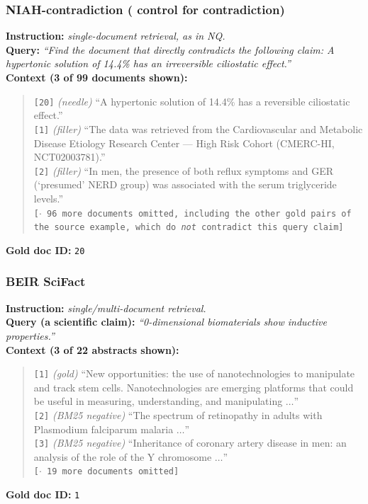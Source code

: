 \subsubsection{NIAH-contradiction (\texorpdfstring{}{OT(N)} control for contradiction)}

\textbf{Instruction:} \emph{single-document retrieval, as in NQ.}\\
\textbf{Query:} \emph{``Find the document that directly contradicts the following claim: A hypertonic
solution of 14.4\% has an irreversible ciliostatic effect.''}\\
\textbf{Context (3 of 99 documents shown):}
\begin{quote}\small
\texttt{[20]} \emph{(needle)} ``A hypertonic solution of 14.4\% has a reversible ciliostatic
effect.''\\
\texttt{[1]} \emph{(filler)} ``The data was retrieved from the Cardiovascular and Metabolic Disease
Etiology Research Center --- High Risk Cohort (CMERC-HI, NCT02003781).''\\
\texttt{[2]} \emph{(filler)} ``In men, the presence of both reflux symptoms and GER (`presumed' NERD
group) was associated with the serum triglyceride levels.''\\
\texttt{[$\cdot$ 96 more documents omitted, including the other gold pairs of the source example,
which do \emph{not} contradict this query claim]}
\end{quote}
\textbf{Gold doc ID:} \texttt{20}

\subsubsection{BEIR SciFact}

\textbf{Instruction:} \emph{single/multi-document retrieval.}\\
\textbf{Query (a scientific claim):} \emph{``0-dimensional biomaterials show inductive
properties.''}\\
\textbf{Context (3 of 22 abstracts shown):}
\begin{quote}\small
\texttt{[1]} \emph{(gold)} ``New opportunities: the use of nanotechnologies to manipulate and track
stem cells. Nanotechnologies are emerging platforms that could be useful in measuring,
understanding, and manipulating $\dots$''\\
\texttt{[2]} \emph{(BM25 negative)} ``The spectrum of retinopathy in adults with Plasmodium
falciparum malaria $\dots$''\\
\texttt{[3]} \emph{(BM25 negative)} ``Inheritance of coronary artery disease in men: an analysis of
the role of the Y chromosome $\dots$''\\
\texttt{[$\cdot$ 19 more documents omitted]}
\end{quote}
\textbf{Gold doc ID:} \texttt{1}

